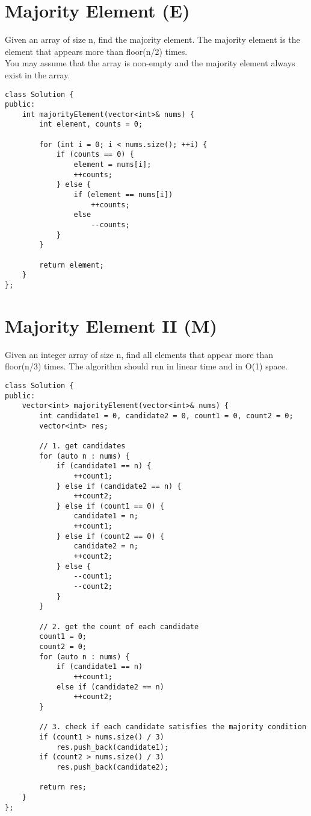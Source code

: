 \section{Majority Element (E)}
Given an array of size n, find the majority element. The majority element is the element that appears more than floor(n/2) times.\\

You may assume that the array is non-empty and the majority element always exist in the array.\\

\begin{lstlisting}
class Solution {
public:
    int majorityElement(vector<int>& nums) {
        int element, counts = 0;
        
        for (int i = 0; i < nums.size(); ++i) {
            if (counts == 0) {
                element = nums[i];
                ++counts;
            } else {
                if (element == nums[i])
                    ++counts;
                else
                    --counts;
            }
        }
        
        return element;
    }
};
\end{lstlisting}


\section{Majority Element II (M)}
Given an integer array of size n, find all elements that appear more than floor(n/3) times. The algorithm should run in linear time and in O(1) space. \\

\begin{lstlisting}
class Solution {
public:
    vector<int> majorityElement(vector<int>& nums) {
        int candidate1 = 0, candidate2 = 0, count1 = 0, count2 = 0;
        vector<int> res;
        
        // 1. get candidates
        for (auto n : nums) {
            if (candidate1 == n) {
                ++count1;
            } else if (candidate2 == n) {
                ++count2;
            } else if (count1 == 0) {
                candidate1 = n;
                ++count1;
            } else if (count2 == 0) {
                candidate2 = n;
                ++count2;
            } else {
                --count1;
                --count2;
            }
        }
        
        // 2. get the count of each candidate
        count1 = 0;
        count2 = 0;
        for (auto n : nums) {
            if (candidate1 == n)
                ++count1;
            else if (candidate2 == n)
                ++count2;
        }
        
        // 3. check if each candidate satisfies the majority condition
        if (count1 > nums.size() / 3)
            res.push_back(candidate1);
        if (count2 > nums.size() / 3)
            res.push_back(candidate2);
            
        return res;
    }
};
\end{lstlisting}


